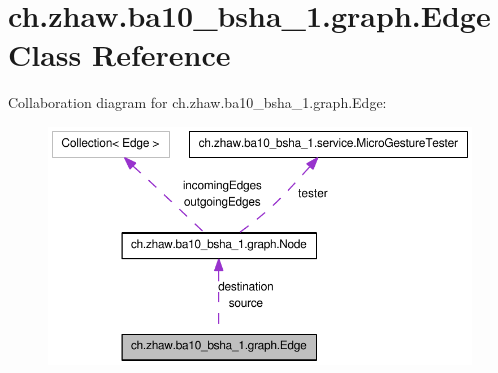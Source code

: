 \hypertarget{classch_1_1zhaw_1_1ba10__bsha__1_1_1graph_1_1Edge}{
\section{ch.zhaw.ba10\_\-bsha\_\-1.graph.Edge Class Reference}
\label{classch_1_1zhaw_1_1ba10__bsha__1_1_1graph_1_1Edge}
}
Collaboration diagram for ch.zhaw.ba10\_\-bsha\_\-1.graph.Edge:\nopagebreak
\begin{figure}[H]
\begin{center}
\leavevmode
\includegraphics[width=396pt]{classch_1_1zhaw_1_1ba10__bsha__1_1_1graph_1_1Edge__coll__graph}
\end{center}
\end{figure}
